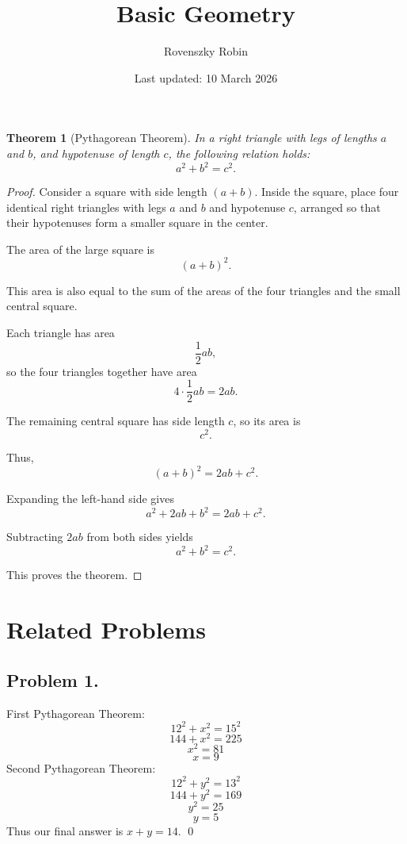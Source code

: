 \documentclass{article}
\title{Basic Geometry}
\author{Rovenszky Robin}
\date{Last updated: 10 March 2026}
\newtheorem{theorem}{Theorem}
\begin{document}
\maketitle

\begin{theorem}[Pythagorean Theorem]
In a right triangle with legs of lengths $a$ and $b$, and hypotenuse of length $c$, the following relation holds:
\[
a^2 + b^2 = c^2.
\]
\end{theorem}

\begin{proof}
Consider a square with side length $(a+b)$. Inside the square, place four identical right triangles with legs $a$ and $b$ and hypotenuse $c$, arranged so that their hypotenuses form a smaller square in the center.

The area of the large square is
\[
(a+b)^2.
\]

This area is also equal to the sum of the areas of the four triangles and the small central square.

Each triangle has area
\[
\frac{1}{2}ab,
\]
so the four triangles together have area
\[
4 \cdot \frac{1}{2}ab = 2ab.
\]

The remaining central square has side length $c$, so its area is
\[
c^2.
\]

Thus,
\[
(a+b)^2 = 2ab + c^2.
\]

Expanding the left-hand side gives
\[
a^2 + 2ab + b^2 = 2ab + c^2.
\]

Subtracting $2ab$ from both sides yields
\[
a^2 + b^2 = c^2.
\]

This proves the theorem.
\end{proof}

\newpage

\section{Related Problems}
\subsection{Problem 1.}

First Pythagorean Theorem:
\begin{equation}
    12^2 + x^2 = 15^2
\end{equation}
\begin{equation}
    144+x^2 = 225
\end{equation}
\begin{equation}
    x^2 = 81
\end{equation}
\begin{equation}
    x = 9
\end{equation}
Second Pythagorean Theorem:
\begin{equation}
    12^2 + y^2 = 13^2
\end{equation}
\begin{equation}
    144 + y^2 = 169
\end{equation}
\begin{equation}
    y^2 = 25
\end{equation}
\begin{equation}
    y = 5
\end{equation}
Thus our final answer is $x + y = 14$. \qed
\end{document}
